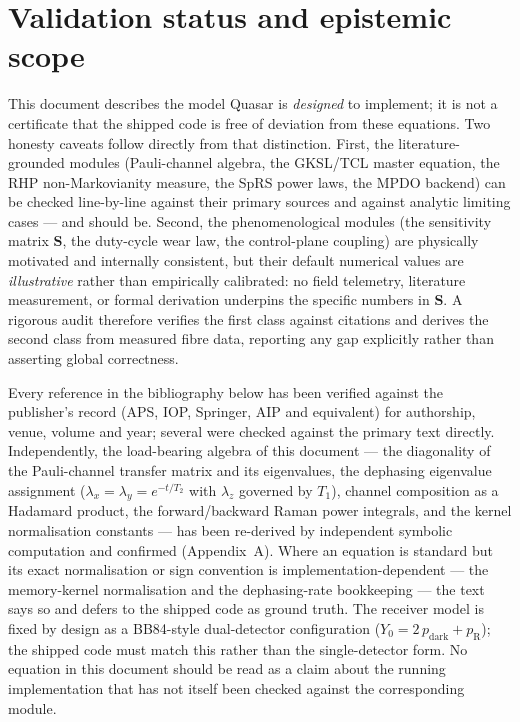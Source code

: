 \documentclass[11pt]{article}
\begin{document}
\section{Validation status and epistemic scope}
This document describes the model Quasar is \emph{designed} to implement; it is not a
certificate that the shipped code is free of deviation from these equations. Two honesty
caveats follow directly from that distinction. First, the literature-grounded modules
(Pauli-channel algebra, the GKSL/TCL master equation, the RHP non-Markovianity measure, the
SpRS power laws, the MPDO backend) can be checked line-by-line against their primary sources
and against analytic limiting cases --- and should be. Second, the phenomenological modules (the
sensitivity matrix $\mathbf{S}$, the duty-cycle wear law, the control-plane coupling) are
physically motivated and internally consistent, but their default numerical values are
\emph{illustrative} rather than empirically calibrated: no field telemetry, literature
measurement, or formal derivation underpins the specific numbers in $\mathbf{S}$.
A rigorous audit therefore verifies the first class against citations and derives the
second class from measured fibre data, reporting any gap explicitly rather than asserting
global correctness.

Every reference in the bibliography below has been verified against the publisher's record
(APS, IOP, Springer, AIP and equivalent) for authorship, venue, volume and year; several were
checked against the primary text directly. Independently, the load-bearing algebra of this
document --- the diagonality of the Pauli-channel transfer matrix and its eigenvalues, the
dephasing eigenvalue assignment ($\lambda_x=\lambda_y=e^{-t/T_2}$ with $\lambda_z$ governed by
$T_1$), channel composition as a Hadamard product, the forward/backward Raman power integrals,
and the kernel normalisation constants --- has been re-derived by independent symbolic
computation and confirmed (Appendix~A). Where an equation is standard but its exact
normalisation or sign convention is implementation-dependent --- the memory-kernel
normalisation and the dephasing-rate bookkeeping --- the text says so and defers to the shipped
code as ground truth. The receiver model is fixed by design as a BB84-style dual-detector
configuration ($Y_0=2\,p_{\mathrm{dark}}+p_{\mathrm{R}}$); the shipped code must match this
rather than the single-detector form. No equation in this document should be read as a
claim about the running implementation that has not itself been checked against the
corresponding module.
\end{document}
